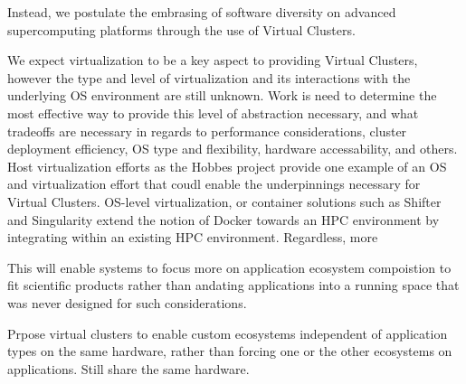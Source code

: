 Instead, we postulate the embrasing of software diversity on advanced supercomputing platforms through the use of Virtual Clusters.  




We expect virtualization to be a key aspect to providing Virtual Clusters, however the type and level of virtualization and its interactions with the underlying OS environment are still unknown.  Work is need to determine the most effective way to provide this level of abstraction necessary, and what tradeoffs are necessary in regards to performance considerations, cluster deployment efficiency, OS type and flexibility, hardware accessability, and others.  Host virtualization efforts as the Hobbes project \cite{hobbes} provide one example of an OS and virtualization effort that coudl enable the underpinnings necessary for Virtual Clusters.  OS-level virtualization, or container solutions such as Shifter and Singularity \cite{shiftercug2016, singularity} extend the notion of Docker towards an HPC environment by integrating within an existing HPC environment. Regardless, more 


This will enable systems to focus more on application ecosystem compoistion to fit scientific products rather than andating applications into a running space that was never designed for such considerations. 



Prpose virtual clusters to enable custom ecosystems independent of application types on the same hardware, rather than forcing one or the other ecosystems on applications. Still share the same hardware.






